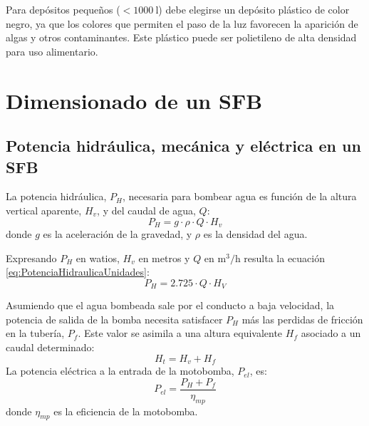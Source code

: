 Para depósitos pequeños ($<\SI{1000}{\litre}$) debe elegirse un depósito
plástico de color negro, ya que los colores que permiten el paso de
la luz favorecen la aparición de algas y otros contaminantes. Este
plástico puede ser polietileno de alta densidad para uso alimentario.


\section{Dimensionado de un SFB}


\subsection{Potencia hidráulica, mecánica y eléctrica en un SFB}

La potencia hidráulica, $P_{H}$, necesaria para bombear agua es función
de la altura vertical aparente, $H_{v}$,
y del caudal de agua, $Q$:\begin{equation}
P_{H}=g\cdot\rho\cdot Q\cdot H_{v}\label{eq:PotenciaHidraulica}\end{equation}
donde $g$ es la aceleración de la gravedad, y $\rho$ es la densidad
del agua. 

Expresando $P_{H}$ en watios, $H_{v}$ en metros y $Q$ en $\si{\meter\cubed\per\hour}$
resulta la ecuación \ref{eq:PotenciaHidraulicaUnidades}: \begin{equation}
P_{H}=2.725\cdot Q\cdot H_{V}\label{eq:PotenciaHidraulicaUnidades}\end{equation}


Asumiendo que el agua bombeada sale por el conducto a baja velocidad,
la potencia de salida de la bomba necesita satisfacer $P_{H}$ más
las perdidas de fricción en la tubería, $P_{f}$.
Este valor se asimila a una altura equivalente $H_{f}$
asociado a un caudal determinado:\begin{equation}
H_{t}=H_{v}+H_{f}\end{equation}
La potencia eléctrica a la entrada de la motobomba, $P_{el}$, es:\begin{equation}
P_{el}=\frac{P_{H}+P_{f}}{\eta_{mp}}\end{equation}
donde
$\eta_{mp}$ es la eficiencia de la motobomba.  

